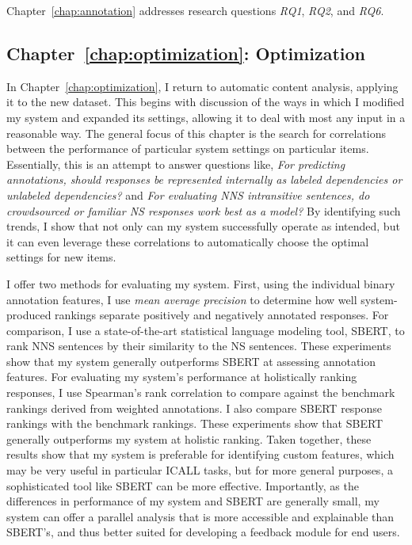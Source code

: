 Chapter~\ref{chap:annotation} addresses research questions \textit{RQ1}, \textit{RQ2}, and \textit{RQ6}.


\subsection{Chapter~\ref{chap:optimization}: Optimization}

In Chapter~\ref{chap:optimization}, I return to automatic content analysis, applying it to the new dataset. This begins with discussion of the ways in which I modified my system and expanded its settings, allowing it to deal with most any input in a reasonable way.
 The general focus of this chapter is the search for correlations between the performance of particular system settings on particular items. Essentially, this is an attempt to answer questions like, \textit{For predicting  annotations, should responses be represented internally as labeled dependencies or unlabeled dependencies?} and \textit{For evaluating NNS intransitive sentences, do crowdsourced or familiar NS responses work best as a model?} By identifying such trends, I show that not only can my system successfully operate as intended, but it can even leverage these correlations to automatically choose the optimal settings for new items.

I offer two methods for evaluating my system. First, using the individual binary annotation features, I use \textit{mean average precision} to determine how well system-produced rankings separate positively and negatively annotated responses. For comparison, I use a state-of-the-art statistical language modeling tool, SBERT, to rank NNS sentences by their similarity to the NS sentences. These experiments show that my system generally outperforms SBERT at assessing annotation features. For evaluating my system's performance at holistically ranking responses, I use Spearman's rank correlation to compare against the benchmark rankings derived from weighted annotations. I also compare SBERT response rankings with the benchmark rankings. These experiments show that SBERT generally outperforms my system at holistic ranking. Taken together, these results show that my system is preferable for identifying custom features, which may be very useful in particular ICALL tasks, but for more general purposes, a sophisticated tool like SBERT can be more effective. Importantly, as the differences in performance of my system and SBERT are generally small, my system can offer a parallel analysis that is more accessible and explainable than SBERT's, and thus better suited for developing a feedback module for end users.

